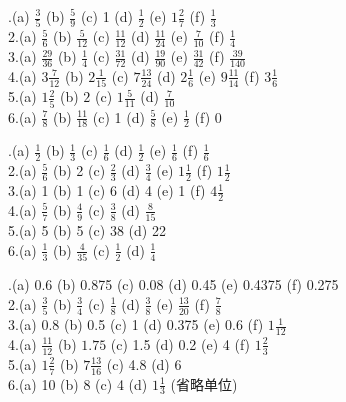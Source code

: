 \documentclass[a4paper,12pt]{ctexart}
\begin{document}
.(a) $\frac35$ \quad (b) $\frac59$ \quad (c) 1 \quad (d) $\frac12$ \quad (e) $1\frac27$ \quad (f) $\frac13$ \\
2.(a) $\frac56$ \quad (b) $\frac{5}{12}$ \quad (c) $\frac{11}{12}$ \quad (d) $\frac{11}{24}$ \quad (e) $\frac{7}{10}$ \quad (f) $\frac14$ \\
3.(a) $\frac{29}{36}$ \quad (b) $\frac14$ \quad (c) $\frac{31}{72}$ \quad (d) $\frac{19}{90}$ \quad (e) $\frac{31}{42}$ \quad (f) $\frac{39}{140}$ \\
4.(a) $3\frac{7}{12}$ \quad (b) $2\frac{1}{15}$ \quad (c) $7\frac{13}{24}$ \quad (d) $2\frac16$ \quad (e) $9\frac{11}{14}$ \quad (f) $3\frac{1}{6}$ \\
5.(a) $1\frac25$ \quad (b) $2$ \quad (c) $1\frac{5}{11}$ \quad (d) $\frac{7}{10}$ \\
6.(a) $\frac78$ \quad (b) $\frac{11}{18}$ \quad (c) 1 \quad (d) $\frac58$ \quad (e) $\frac12$ \quad (f) 0

.(a) $\frac12$ \quad (b) $\frac13$ \quad (c) $\frac16$ \quad (d) $\frac12$ \quad (e) $\frac16$ \quad (f) $\frac{1}{6}$ \\
2.(a) $\frac56$ \quad (b) 2 \quad (c) $\frac23$ \quad (d) $\frac34$ \quad (e) $1\frac12$ \quad (f) $1\frac12$ \\
3.(a) 1 \quad (b) 1 \quad (c) 6 \quad (d) 4 \quad (e) 1 \quad (f) $4\frac12$ \\
4.(a) $\frac57$ \quad (b) $\frac49$ \quad (c) $\frac38$ \quad (d) $\frac{8}{15}$ \\
5.(a) 5 \quad (b) 5 \quad (c) 38 \quad (d) 22 \\
6.(a) $\frac13$ \quad (b) $\frac{4}{35}$ \quad (c) $\frac12$ \quad (d) $\frac14$

.(a) 0.6 \quad (b) 0.875 \quad (c) 0.08 \quad (d) 0.45 \quad (e) 0.4375 \quad (f) 0.275 \\
2.(a) $\frac35$ \quad (b) $\frac34$ \quad (c) $\frac18$ \quad (d) $\frac38$ \quad (e) $\frac{13}{20}$ \quad (f) $\frac78$ \\
3.(a) 0.8 \quad (b) 0.5 \quad (c) 1 \quad (d) 0.375 \quad (e) 0.6 \quad (f) $1\frac{1}{12}$ \\
4.(a) $\frac{11}{12}$ \quad (b) $1.75$ \quad (c) 1.5 \quad (d) 0.2 \quad (e) 4 \quad (f) $1\frac23$ \\
5.(a) $1\frac{2}{7}$ \quad (b) $7\frac{13}{16}$ \quad (c) 4.8 \quad (d) 6 \\
6.(a) 10 \quad (b) 8 \quad (c) 4 \quad (d) $1\frac{1}{3}$ \quad (省略单位)
\end{document}
